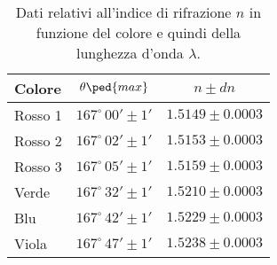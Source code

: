 \begin{table}[H]
    \centering
    \small
    \begin{tabular}{l c c}
        \toprule
        Colore & $\theta\ped{max}$ & $n \pm dn$ \\
        \midrule
		Rosso 1	& 	$167^\circ \, 00' \pm 1'$ &	$1.5149 \pm 0.0003$ \\	
		Rosso 2	& 	$167^\circ \, 02' \pm 1'$ &	$1.5153 \pm 0.0003$ \\
		Rosso 3	& 	$167^\circ \, 05' \pm 1'$ &	$1.5159 \pm 0.0003$ \\
		Verde &		$167^\circ \, 32' \pm 1'$ &	$1.5210 \pm 0.0003$ \\
		Blu &		$167^\circ \, 42' \pm 1'$ &	$1.5229 \pm 0.0003$ \\
		Viola &		$167^\circ \, 47' \pm 1'$ &	$1.5238 \pm 0.0003$ \\
        \bottomrule
    \end{tabular}
    \caption{Dati relativi all'indice di rifrazione $n$ in funzione del colore e quindi della lunghezza d'onda $\lambda$.}
    \label{tab:enne}
\end{table}
